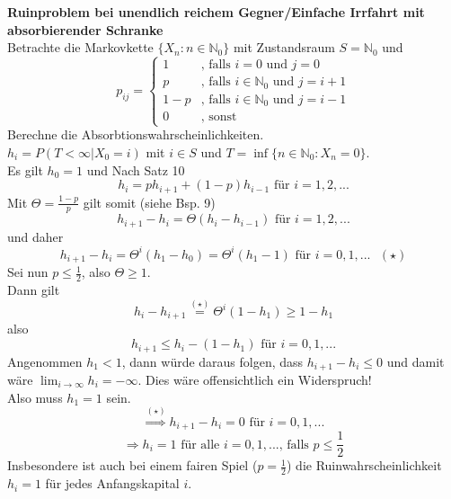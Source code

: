 \documentclass[a4paper,12pt]{article}
\begin{document}
\begin{tcolorbox}[breakable, colframe=blue, colback=white, title=Beispiel 10]
	\textbf{Ruinproblem bei unendlich reichem Gegner/Einfache Irrfahrt mit absorbierender Schranke}\\
	Betrachte die Markovkette $\{X_n:n \in \mathbb{N}_0\}$ mit Zustandsraum $S = \mathbb{N}_0$ und
	$$
		p_{ij} = \begin{cases}
			1   & \text{, falls }i = 0 \text{ und } j=0                   \\
			p   & \text{, falls } i \in \mathbb{N}_0 \text{ und } j = i+1 \\
			1-p & \text{, falls } i \in \mathbb{N}_0 \text{ und } j = i-1 \\
			0   & \text{, sonst }
		\end{cases}
	$$
	Berechne die Absorbtionswahrscheinlichkeiten.\\
	$h_i = P(T < \infty | X_0 = i)$ mit $i \in S$ und $T = \inf\{n \in \mathbb{N}_0: X_n = 0\}$.\\
	Es gilt $h_0 = 1$ und Nach Satz 10
	$$
		h_i = ph_{i+1} + (1-p)h_{i-1} \text{ für } i=1, 2, ...
	$$
	Mit $\Theta = \frac{1-p}{p}$ gilt somit (siehe Bsp. 9)
	$$
		h_{i+1} - h_i = \Theta(h_i - h_{i-1}) \text{ für }	i=1, 2, ...
	$$
	und daher
	$$
		h_{i+1} - h_i = \Theta^{i}(h_1 - h_0) = \Theta^{i}(h_1 - 1) \text{ für } i = 0, 1, ...  \text{ } (\star)
	$$
	Sei nun $p \leq \frac{1}{2}$, also $\Theta \geq 1$.\\
	Dann gilt
	$$
		h_i - h_{i+1} \overset{(\star)}{=} \Theta^{i}(1- h_1) \geq 1-h_1
	$$
	also
	$$
		h_{i+1} \leq h_i - (1-h_1) \text{ für } i = 0,1, ...
	$$
	Angenommen $h_1 < 1$, dann würde daraus folgen, dass $h_{i+1}  - h_i \leq 0$ und damit wäre
	$\lim_{i \to \infty}h_i = - \infty$. Dies wäre offensichtlich ein Widerspruch!\\


	Also muss $h_1 = 1$ sein.
	$$
		\overset{(\star)}{\Rightarrow} h_{i+1} - h_i = 0 \text{ für } i = 0, 1, ...
	$$
	$$
		\Rightarrow h_i = 1 \text{ für alle } i = 0, 1, ... \text{, falls } p \leq \frac{1}{2}
	$$
	Insbesondere ist auch bei einem fairen Spiel ($p = \frac{1}{2}$) die Ruinwahrscheinlichkeit $h_i = 1$ für jedes Anfangskapital $i$.\\



\end{tcolorbox}
\end{document}
